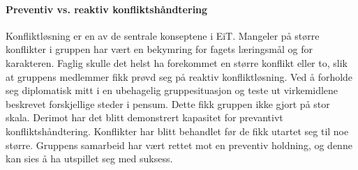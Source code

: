 \paragraph{Preventiv vs. reaktiv konfliktshåndtering}
Konfliktløsning er en av de sentrale konseptene i EiT.
Mangeler på større konflikter i gruppen har vært en bekymring for fagets læringsmål og for karakteren. 
Faglig skulle det helst ha forekommet en større konflikt eller to, slik at gruppens medlemmer fikk prøvd seg på reaktiv konfliktløsning. 
Ved å forholde seg diplomatisk mitt i en ubehagelig gruppesituasjon og teste ut virkemidlene beskrevet forskjellige steder i pensum. 
Dette fikk gruppen ikke gjort på stor skala.
Derimot har det blitt demonstrert kapasitet for prevantivt konfliktshåndtering. 
Konflikter har blitt behandlet før de fikk utartet seg til noe større. 
Gruppens samarbeid har vært rettet mot en preventiv holdning, og denne kan sies å ha utspillet seg med suksess. 


